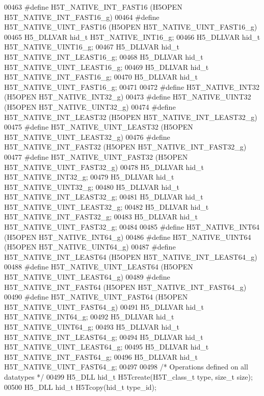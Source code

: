 \begin{DoxyCode}
00463 \textcolor{preprocessor}{#define H5T\_NATIVE\_INT\_FAST16       (H5OPEN H5T\_NATIVE\_INT\_FAST16\_g)}
00464 \textcolor{preprocessor}{#define H5T\_NATIVE\_UINT\_FAST16      (H5OPEN H5T\_NATIVE\_UINT\_FAST16\_g)}
00465 H5\_DLLVAR hid\_t H5T\_NATIVE\_INT16\_g;
00466 H5\_DLLVAR hid\_t H5T\_NATIVE\_UINT16\_g;
00467 H5\_DLLVAR hid\_t H5T\_NATIVE\_INT\_LEAST16\_g;
00468 H5\_DLLVAR hid\_t H5T\_NATIVE\_UINT\_LEAST16\_g;
00469 H5\_DLLVAR hid\_t H5T\_NATIVE\_INT\_FAST16\_g;
00470 H5\_DLLVAR hid\_t H5T\_NATIVE\_UINT\_FAST16\_g;
00471 
00472 \textcolor{preprocessor}{#define H5T\_NATIVE\_INT32        (H5OPEN H5T\_NATIVE\_INT32\_g)}
00473 \textcolor{preprocessor}{#define H5T\_NATIVE\_UINT32       (H5OPEN H5T\_NATIVE\_UINT32\_g)}
00474 \textcolor{preprocessor}{#define H5T\_NATIVE\_INT\_LEAST32      (H5OPEN H5T\_NATIVE\_INT\_LEAST32\_g)}
00475 \textcolor{preprocessor}{#define H5T\_NATIVE\_UINT\_LEAST32     (H5OPEN H5T\_NATIVE\_UINT\_LEAST32\_g)}
00476 \textcolor{preprocessor}{#define H5T\_NATIVE\_INT\_FAST32       (H5OPEN H5T\_NATIVE\_INT\_FAST32\_g)}
00477 \textcolor{preprocessor}{#define H5T\_NATIVE\_UINT\_FAST32      (H5OPEN H5T\_NATIVE\_UINT\_FAST32\_g)}
00478 H5\_DLLVAR hid\_t H5T\_NATIVE\_INT32\_g;
00479 H5\_DLLVAR hid\_t H5T\_NATIVE\_UINT32\_g;
00480 H5\_DLLVAR hid\_t H5T\_NATIVE\_INT\_LEAST32\_g;
00481 H5\_DLLVAR hid\_t H5T\_NATIVE\_UINT\_LEAST32\_g;
00482 H5\_DLLVAR hid\_t H5T\_NATIVE\_INT\_FAST32\_g;
00483 H5\_DLLVAR hid\_t H5T\_NATIVE\_UINT\_FAST32\_g;
00484 
00485 \textcolor{preprocessor}{#define H5T\_NATIVE\_INT64        (H5OPEN H5T\_NATIVE\_INT64\_g)}
00486 \textcolor{preprocessor}{#define H5T\_NATIVE\_UINT64       (H5OPEN H5T\_NATIVE\_UINT64\_g)}
00487 \textcolor{preprocessor}{#define H5T\_NATIVE\_INT\_LEAST64      (H5OPEN H5T\_NATIVE\_INT\_LEAST64\_g)}
00488 \textcolor{preprocessor}{#define H5T\_NATIVE\_UINT\_LEAST64     (H5OPEN H5T\_NATIVE\_UINT\_LEAST64\_g)}
00489 \textcolor{preprocessor}{#define H5T\_NATIVE\_INT\_FAST64       (H5OPEN H5T\_NATIVE\_INT\_FAST64\_g)}
00490 \textcolor{preprocessor}{#define H5T\_NATIVE\_UINT\_FAST64      (H5OPEN H5T\_NATIVE\_UINT\_FAST64\_g)}
00491 H5\_DLLVAR hid\_t H5T\_NATIVE\_INT64\_g;
00492 H5\_DLLVAR hid\_t H5T\_NATIVE\_UINT64\_g;
00493 H5\_DLLVAR hid\_t H5T\_NATIVE\_INT\_LEAST64\_g;
00494 H5\_DLLVAR hid\_t H5T\_NATIVE\_UINT\_LEAST64\_g;
00495 H5\_DLLVAR hid\_t H5T\_NATIVE\_INT\_FAST64\_g;
00496 H5\_DLLVAR hid\_t H5T\_NATIVE\_UINT\_FAST64\_g;
00497 
00498 \textcolor{comment}{/* Operations defined on all datatypes */}
00499 H5\_DLL hid\_t H5Tcreate(H5T\_class\_t type, \textcolor{keywordtype}{size\_t} size);
00500 H5\_DLL hid\_t H5Tcopy(hid\_t type\_id);

\end{DoxyCode}
